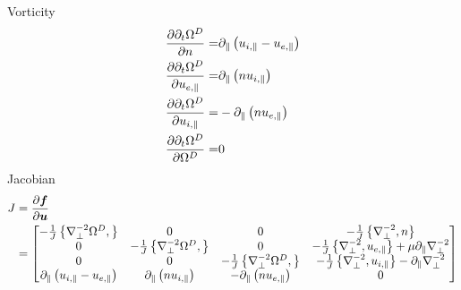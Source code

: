 Vorticity
\begin{align*}
  \frac{\partial {\partial_t \Omega^D}}{\partial{n}} =&
  \partial_\| \left(u_{i,\|} - u_{e,\|} \right)
  \\
  \frac{\partial {\partial_t \Omega^D}}{\partial{u_{e,\|}}} =&
  \partial_\| \left(nu_{i,\|} \right)
  \\
  \frac{\partial {\partial_t \Omega^D}}{\partial{u_{i,\|}}} =&
  -\partial_\| \left(nu_{e,\|} \right)
  \\
  \frac{\partial {\partial_t \Omega^D}}{\partial{\Omega^D}} =&
  0
\end{align*}
Jacobian
\begin{align*}
    J &= \frac{\partial {\boldsymbol{f}}}{\partial{\boldsymbol{u}}}\\
    &=
    \begin{bmatrix}
        -\frac{1}{J}\left\{\nabla_\perp^{-2}\Omega^D,\right\}
        & 0
        & 0
        & -\frac{1}{J}\left\{\nabla_\perp^{-2},n\right\}
        \\
        0
        & -\frac{1}{J}\left\{\nabla_\perp^{-2}\Omega^D,\right\}
        & 0
        & -\frac{1}{J}\left\{\nabla_\perp^{-2},u_{e,\|}\right\}
          +\mu \partial_\| \nabla_\perp^{-2}
        \\
        0
        & 0
        & -\frac{1}{J}\left\{\nabla_\perp^{-2}\Omega^D,\right\}
        & -\frac{1}{J}\left\{\nabla_\perp^{-2},u_{i,\|}\right\} -
            \partial_\|\nabla_\perp^{-2}
        \\
        \partial_\| \left(u_{i,\|} - u_{e,\|} \right)
        & \partial_\| \left(nu_{i,\|} \right)
        & -\partial_\| \left(nu_{e,\|} \right)
        & 0
    \end{bmatrix}
\end{align*}
%


